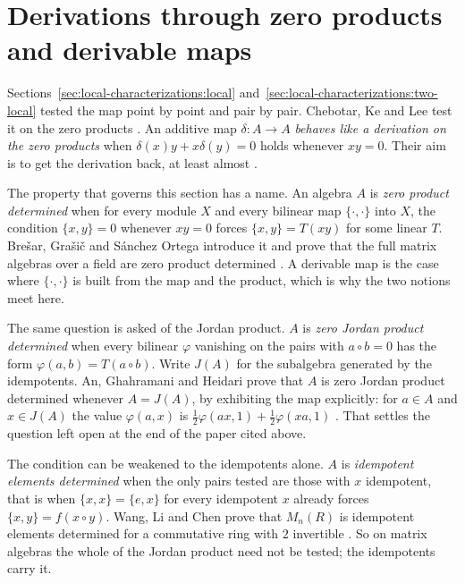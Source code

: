 \section{Derivations through zero products and derivable maps}\label{sec:local-characterizations:zero-products}

Sections~\ref{sec:local-characterizations:local}
and~\ref{sec:local-characterizations:two-local} tested the map point by
point and pair by pair. Chebotar, Ke and Lee test it on the zero products
\cite[p.~217]{ChebotarKeLee2004}. An additive map $\delta\colon A\to A$
\emph{behaves like a derivation on the zero products} when
$\delta(x)y+x\delta(y)=0$ holds whenever $xy=0$. Their aim is to get the
derivation back, at least almost \cite[p.~217]{ChebotarKeLee2004}.

The property that governs this section has a name. An algebra $A$ is
\emph{zero product determined} \cite[p.~1487]{BresarGrasicSanchezOrtega2009}
when for every module $X$ and every bilinear map $\{\cdot,\cdot\}$ into $X$,
the condition $\{x,y\}=0$ whenever $xy=0$ forces $\{x,y\}=T(xy)$ for some
linear $T$. Bre\v{s}ar, Gra\v{s}i\v{c} and S\'anchez Ortega introduce it and
prove that the full matrix algebras over a field are zero product determined
\cite[p.~1487]{BresarGrasicSanchezOrtega2009}. A derivable map is the case
where $\{\cdot,\cdot\}$ is built from the map and the product, which is why the
two notions meet here.

The same question is asked of the Jordan product. $A$ is
\emph{zero Jordan product determined} \cite[p.~90]{AnGhahramaniHeidari2015ZeroJordan}
when every bilinear $\varphi$ vanishing on the pairs with $a\circ b=0$ has the
form $\varphi(a,b)=T(a\circ b)$. Write $J(A)$ for the subalgebra
generated by the idempotents. An, Ghahramani and Heidari prove that $A$ is zero
Jordan product determined whenever $A=J(A)$, by exhibiting the map explicitly:
for $a\in A$ and $x\in J(A)$ the value $\varphi(a,x)$ is
$\frac12\varphi(ax,1)+\frac12\varphi(xa,1)$
\cite[Theorem~2.1, p.~91]{AnGhahramaniHeidari2015ZeroJordan}. That settles the
question left open at the end of the paper cited above.

The condition can be weakened to the idempotents alone. $A$ is
\emph{idempotent elements determined} \cite[Definition~1.2, p.~2890]{WangLiChen2011Idempotent}
when the only pairs tested are those with $x$ idempotent, that is when
$\{x,x\}=\{e,x\}$ for every idempotent $x$ already forces $\{x,y\}=f(x\circ y)$.
Wang, Li and Chen prove that $M_{n}(R)$ is idempotent elements determined for a
commutative ring with $2$ invertible \cite[Theorem~2.4]{WangLiChen2011Idempotent}.
So on matrix algebras the whole of the Jordan product need not be tested; the
idempotents carry it.

